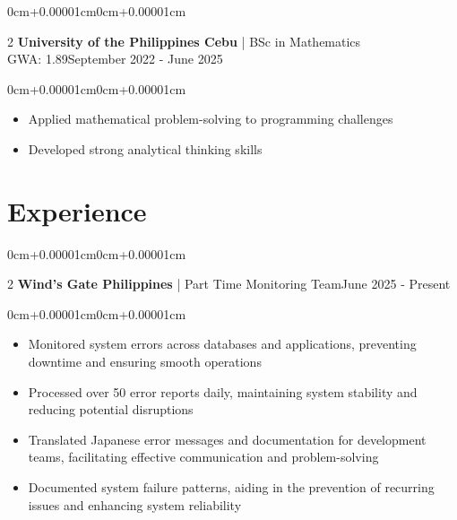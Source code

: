 \documentclass[10pt, letterpaper]{article}
\newenvironment{highlights}{\begin{itemize}[topsep=0.10cm,parsep=0.10cm,partopsep=0pt,itemsep=0pt,leftmargin=0cm+10pt]}{\end{itemize}}
\newenvironment{onecolentry}{\begin{adjustwidth}{0cm+0.00001cm}{0cm+0.00001cm}}{\end{adjustwidth}}
\newenvironment{twocolentry}[2][]{\onecolentry\def\secondColumn{#2}\setcolumnwidth{\fill,5cm}\begin{paracol}{2}}{\switchcolumn \raggedleft \secondColumn\end{paracol}\endonecolentry}
\begin{document}
    \begin{twocolentry}{September 2022 - June 2025}
    \textbf{University of the Philippines Cebu} | BSc in Mathematics\\
    GWA: 1.89\end{twocolentry}
    \vspace{0.10cm}
    \begin{onecolentry}
        
        \begin{highlights}
            \item Applied mathematical problem-solving to programming challenges
            \item Developed strong analytical thinking skills
        \end{highlights}
    \end{onecolentry}
    \vspace{0.15cm}

\section{Experience}

    \begin{twocolentry}{June 2025 - Present}
    \textbf{Wind's Gate Philippines} | Part Time Monitoring Team\end{twocolentry}
    \vspace{0.10cm}
    \begin{onecolentry}
        
    \begin{highlights}
                \item Monitored system errors across databases and applications, preventing downtime and ensuring smooth operations
            \item Processed over 50 error reports daily, maintaining system stability and reducing potential disruptions
            \item Translated Japanese error messages and documentation for development teams, facilitating effective communication and problem-solving
            \item Documented system failure patterns, aiding in the prevention of recurring issues and enhancing system reliability
        \end{highlights}
    \end{onecolentry}
    \vspace{0.15cm}
\end{document}
